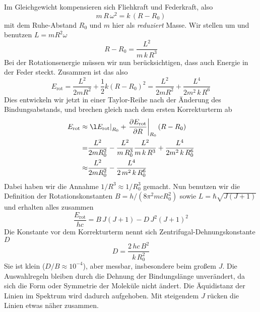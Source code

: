 Im Gleichgewicht kompensieren sich Fliehkraft und Federkraft, also
\begin{equation}
 m \, R \, \omega^2 = k \, ( R - R_0)
\end{equation} 
mit dem Ruhe-Abstand $R_0$ und $m$ hier als \emph{reduziert} Masse. Wir stellen um und benutzen $L = m R^2 \omega$
\begin{equation}
R - R_0 = \frac{L^2}{m \, k \, R^3  } 
\end{equation}
Bei der Rotationsenergie müssen wir nun berücksichtigen, dass auch Energie in der Feder steckt. Zusammen ist das also 
\begin{equation}
 E_\text{rot} = \frac{L^2}{2 m R^2}  + \frac{1}{2} k ( R - R_0)^2 = 
\frac{L^2}{2 m R^2}  + \frac{L^4}{2 m^2 \, k \, R^6  } 
\end{equation}
Dies entwickeln wir jetzt in einer Taylor-Reihe nach der Änderung des Bindungsabstands, und brechen gleich nach dem ersten Korrekturterm ab
\begin{align}
 E_\text{rot} \approx &
 \left. \l E_\text{rot}  \right|_{R_0}  
  + \left. \frac{\partial E_\text{rot}}{\partial R}
 \right|_{R_0}  (R - R_0) \\
 = & \frac{L^2}{2 m R_0^2}  -  \frac{L^2}{m \, R_0^3  }   \frac{L^2}{m \, k \, R^3  }  + \frac{L^4}{2 m^2 \, k \, R_0^6  } \\ 
  \approx & \frac{L^2}{2 m R_0^2}  -  \frac{L^4}{2 \, m^2 \, k\, R_0^6  }   
\end{align}
Dabei haben wir die  Annahme $1/R^3 \approx 1 / R_0^3$ gemacht.
Nun benutzen wir die Definition der Rotationskonstanten $B = h / (8 \pi^2  m  c R_0^2)$ sowie $L = \hbar \sqrt{ J (J+1)}$ und erhalten alles zusammen
\begin{equation}
\frac{ E_\text{rot}}{h c} = B \, J (J+1) - D \, J^2 (J+1)^2
\end{equation}
Die Konstante vor dem Korrekturterm nennt sich Zentrifugal-Dehnungskonstante $D$
\begin{equation}
D = \frac{2 \, h c \, B^2}{k \, R_0^2}
\end{equation}
Sie ist klein ($D/B \approx 10^{-4}$), aber messbar, insbesondere beim großem $J$. Die Auswahlregeln bleiben durch die Dehnung der Bindungslänge unverändert, da sich die Form oder Symmetrie der Moleküle nicht ändert. Die Äquidistanz der Linien im Spektrum wird dadurch aufgehoben. Mit steigendem $J$ rücken die Linien etwas näher zusammen.



